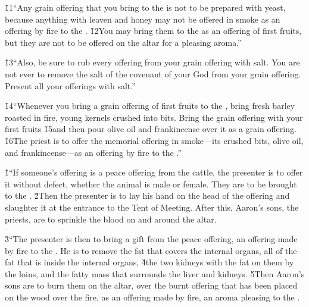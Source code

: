 \v{11}``Any grain offering that you bring to the  is not to be prepared with yeast, because anything with leaven and honey may not be offered in smoke as an offering by fire to the . \v{12}You may bring them to the  as an offering of first fruits, but they are not to be offered on the altar for a pleasing aroma.''

\v{13}``Also, be sure to rub every offering from your grain offering with salt. You are not ever to remove the salt of the covenant of your God from your grain offering. Present all your offerings with salt.''

\v{14}``Whenever you bring a grain offering of first fruits to the , bring fresh barley roasted in fire, young kernels crushed into bits. Bring the grain offering with your first fruits \v{15}and then pour olive oil and frankincense over it as a grain offering. \v{16}The priest is to offer the memorial offering in smoke---its crushed bits, olive oil, and frankincense---as an offering by fire to the .''

\v{1}``If someone's offering is a peace offering from the cattle, the presenter is to offer it without defect, whether the animal is male or female. They are to be brought to the . \v{2}Then the presenter is to lay his hand on the head of the offering and slaughter it at the entrance to the Tent of Meeting. After this, Aaron's sons, the priests, are to sprinkle the blood on and around the altar.

\v{3}``The presenter is then to bring a gift from the peace offering, an offering made by fire to the . He is to remove the fat that covers the internal organs, all of the fat that is inside the internal organs, \v{4}the two kidneys with the fat on them by the loins, and the fatty mass that surrounds the liver and kidneys. \v{5}Then Aaron's sons are to burn them on the altar, over the burnt offering that has been placed on the wood over the fire, as an offering made by fire, an aroma pleasing to the .

